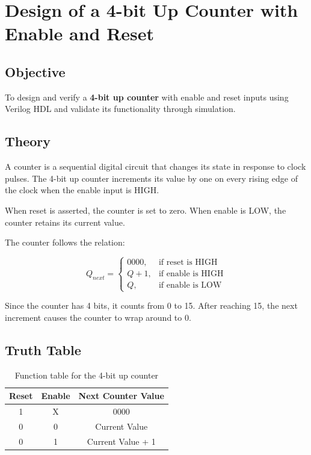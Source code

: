 \documentclass[12pt,a4paper]{report}
\begin{document}
\chapter{Design of a 4-bit Up Counter with Enable and Reset}
\label{ch:pdf20}

\section{Objective}

To design and verify a \textbf{4-bit up counter} with enable and reset inputs using Verilog HDL and validate its functionality through simulation.

\section{Theory}

A counter is a sequential digital circuit that changes its state in response to clock pulses. The 4-bit up counter increments its value by one on every rising edge of the clock when the enable input is HIGH.

When reset is asserted, the counter is set to zero. When enable is LOW, the counter retains its current value.

The counter follows the relation:

\[
Q_{next} =
\begin{cases}
0000, & \text{if reset is HIGH} \\
Q + 1, & \text{if enable is HIGH} \\
Q, & \text{if enable is LOW}
\end{cases}
\]

Since the counter has 4 bits, it counts from 0 to 15. After reaching 15, the next increment causes the counter to wrap around to 0.

\section{Truth Table}

\begin{table}[H]
    \centering
    \begin{tabular}{|c|c|c|}
        \hline
        \textbf{Reset} & \textbf{Enable} & \textbf{Next Counter Value} \\
        \hline
        1 & X & 0000 \\
        \hline
        0 & 0 & Current Value \\
        \hline
        0 & 1 & Current Value + 1 \\
        \hline
    \end{tabular}
    \caption{Function table for the 4-bit up counter}
    \label{tab:up_counter}
\end{table}
\end{document}
